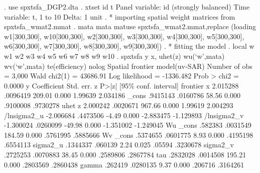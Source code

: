. use spxtsfa_DGP2.dta
{\smallskip}
. xtset id t 
{\smallskip}
Panel variable: id (strongly balanced)
 Time variable: t, 1 to 10
         Delta: 1 unit
{\smallskip}
. * importing spatial weight matrices from spxtsfa_wmat2.mmat
. mata mata matuse spxtsfa_wmat2.mmat,replace
(loading w1[300,300], w10[300,300], w2[300,300], w3[300,300], w4[300,300],
 w5[300,300], w6[300,300], w7[300,300],  w8[300,300], w9[300,300])
{\smallskip}
. * fitting the model
. local w w1 w2 w3 w4 w5 w6 w7 w8 w9 w10
{\smallskip}
. spxtsfa y x, uhet(z) wu(`w',mata) wv(`w',mata) te(efficiency) nolog
{\smallskip}
Spatial frontier model(uv-SAR)                        Number of obs =    3,000
                                                      Wald chi2(1)  = 43686.91
Log likelihood = -1336.482                            Prob > chi2   =   0.0000
{\smallskip}
           y {\VBAR} Coefficient  Std. err.      z    P>|z|     [95\% conf. interval]
frontier     {\VBAR}
           x {\VBAR}   2.015288   .0096419   209.01   0.000      1.99639    2.034186
       _cons {\VBAR}   .9415143   .0160786    58.56   0.000     .9100008    .9730278
uhet         {\VBAR}
           z {\VBAR}   2.000242   .0020671   967.66   0.000      1.99619    2.004293
 /lnsigma2_u {\VBAR}  -2.006684   .4473506    -4.49   0.000    -2.883475   -1.129893
 /lnsigma2_v {\VBAR}  -1.300024   .0260099   -49.98   0.000    -1.351002   -1.249045
Wu           {\VBAR}
       _cons {\VBAR}    .582383   .0031549   184.59   0.000     .5761995    .5885666
Wv           {\VBAR}
       _cons {\VBAR}   .5374655   .0601775     8.93   0.000     .4195198    .6554113
    sigma2_u {\VBAR}   .1344337    .060139     2.24   0.025       .05594    .3230678
    sigma2_v {\VBAR}   .2725253   .0070883    38.45   0.000     .2589806    .2867784
         tau {\VBAR}   .2832028   .0014508   195.21   0.000     .2803569    .2860438
       gamma {\VBAR}    .262419   .0280135     9.37   0.000      .206716    .3164261
